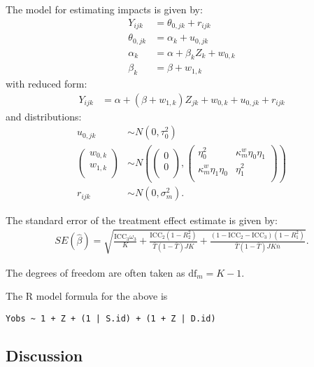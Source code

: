 \documentclass[12pt]{article}
\begin{document}
The model for estimating impacts is given by: \[
\begin{aligned}
Y_{ijk} &=  \theta_{0,jk}  + r_{ijk}\\
 \theta_{0,jk} &= \alpha_k + u_{0,jk}\\
 \alpha_k  &= \alpha + \beta_{k} Z_{k} + w_{0,k} \\
 \beta_{k} &= \beta + w_{1,k}
\end{aligned}
\] with reduced form: \[
\begin{aligned}
Y_{ijk} &= \alpha + \left(\beta + w_{1,k}\right) Z_{jk} + w_{0,k} + u_{0,jk} + r_{ijk}
\end{aligned}
\] 
and distributions: 
\[
\begin{aligned}
u_{0,jk} &\sim N\left(0, \tau^2_{0}\right)\\
\nonumber \begin{pmatrix} w_{0, k} \\ w_{1,k}\\ \end{pmatrix} &\sim
N\left(\begin{pmatrix} 0 \\ 0\\ \end{pmatrix}, \begin{pmatrix} \eta^2_{0} & \kappa^w_{m} \eta_{0} \eta_{1} \\ \kappa^w_{m} \eta_{1} \eta_{0} & \eta^2_{1} \\ \end{pmatrix}\right) \\
\nonumber r_{ijk} &\sim N\left(0, \sigma^2_m\right).
\end{aligned}
\]

The standard error of the treatment effect estimate is given by: \[
\begin{aligned}
SE( \hat{\beta} ) = \sqrt{
\frac{\text{ICC}_{3} \omega_{3}}{K} +
\frac{\text{ICC}_{2}(1 - R^2_{2})}{\bar{T}(1 - \bar{T}) J K } +
\frac{(1-\text{ICC}_{2} - \text{ICC}_{3})(1-R^2_{1})}{\bar{T}(1 - \bar{T}) J K\bar{n}} }.\end{aligned}
\]

The degrees of freedom are often taken as $\text{df}_m = K - 1$.

The R model formula for the above is

\begin{verbatim}
Yobs ~ 1 + Z + (1 | S.id) + (1 + Z | D.id)
\end{verbatim}


\subsection{Discussion}\label{discussion}
\end{document}
